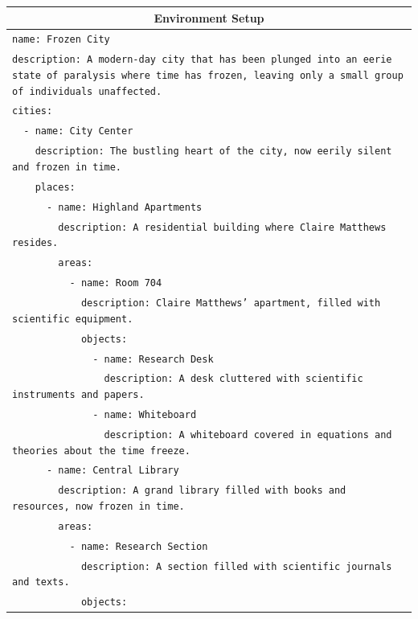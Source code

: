 \documentclass[letterpaper]{article} %
\begin{document}
\begin{small}
\begin{longtable}{p{\textwidth}}
    \multicolumn{1}{c}{\textbf{Environment Setup}} \\
    \midrule
    \texttt{name: Frozen City} \\
    \texttt{description: A modern-day city that has been plunged into an eerie state of paralysis where time has frozen, leaving only a small group of individuals unaffected.} \\
    \texttt{cities:} \\
    \texttt{\ \ - name: City Center} \\
    \texttt{\ \ \ \ description: The bustling heart of the city, now eerily silent and frozen in time.} \\
    \texttt{\ \ \ \ places:} \\
    \texttt{\ \ \ \ \ \ - name: Highland Apartments} \\
    \texttt{\ \ \ \ \ \ \ \ description: A residential building where Claire Matthews resides.} \\
    \texttt{\ \ \ \ \ \ \ \ areas:} \\
    \texttt{\ \ \ \ \ \ \ \ \ \ - name: Room 704} \\
    \texttt{\ \ \ \ \ \ \ \ \ \ \ \ description: Claire Matthews' apartment, filled with scientific equipment.} \\
    \texttt{\ \ \ \ \ \ \ \ \ \ \ \ objects:} \\
    \texttt{\ \ \ \ \ \ \ \ \ \ \ \ \ \ - name: Research Desk} \\
    \texttt{\ \ \ \ \ \ \ \ \ \ \ \ \ \ \ \ description: A desk cluttered with scientific instruments and papers.} \\
    \texttt{\ \ \ \ \ \ \ \ \ \ \ \ \ \ - name: Whiteboard} \\
    \texttt{\ \ \ \ \ \ \ \ \ \ \ \ \ \ \ \ description: A whiteboard covered in equations and theories about the time freeze.} \\
    \texttt{\ \ \ \ \ \ - name: Central Library} \\
    \texttt{\ \ \ \ \ \ \ \ description: A grand library filled with books and resources, now frozen in time.} \\
    \texttt{\ \ \ \ \ \ \ \ areas:} \\
    \texttt{\ \ \ \ \ \ \ \ \ \ - name: Research Section} \\
    \texttt{\ \ \ \ \ \ \ \ \ \ \ \ description: A section filled with scientific journals and texts.} \\
    \texttt{\ \ \ \ \ \ \ \ \ \ \ \ objects:} \\

\end{longtable}
\end{small}
\end{document}
